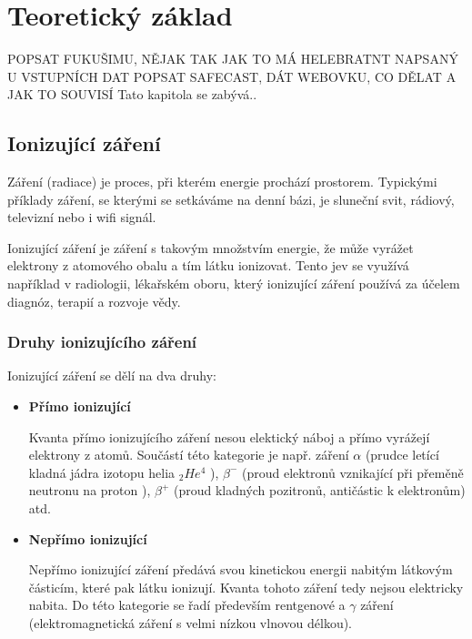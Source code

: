 \chapter{Teoretický základ}
\label{2-teorie}
POPSAT FUKUŠIMU, NĚJAK TAK JAK TO MÁ HELEBRATNT NAPSANÝ U VSTUPNÍCH DAT
POPSAT SAFECAST, DÁT WEBOVKU, CO DĚLAT A JAK TO SOUVISÍ
Tato kapitola se zabývá..
\section{Ionizující záření}
	
Záření (radiace) je proces, při kterém energie prochází prostorem. Typickými příklady záření, se kterými se setkáváme na denní bázi, je sluneční svit, rádiový, televizní nebo i wifi signál. %


Ionizující záření je záření s takovým množstvím energie, že může vyrážet elektrony z atomového obalu a tím látku ionizovat. Tento jev se využívá například v radiologii, lékařském oboru, který ionizující záření používá za účelem diagnóz, terapií a rozvoje vědy. %

\subsection{Druhy ionizujícího záření} %
Ionizující záření se dělí na dva druhy:

\begin{itemize}
	\item \textbf{Přímo ionizující}
	
		Kvanta přímo ionizujícího záření nesou elektický náboj a přímo vyrážejí elektrony z atomů. Součástí této kategorie je např. záření $\alpha$ (prudce letící kladná jádra izotopu helia $_{2}He^{4}$ %
		), $\beta^{-}$ (proud elektronů vznikající při přeměně neutronu na proton %
		), $\beta^{+}$ (proud kladných pozitronů, antičástic k elektronům) %
		 atd.
		 
	\item \textbf{Nepřímo ionizující}
	
		Nepřímo ionizující záření předává svou kinetickou energii nabitým látkovým částicím, které pak látku ionizují. Kvanta tohoto záření tedy nejsou elektricky nabita. Do této kategorie se řadí především rentgenové a $\gamma$ záření (elektromagnetická záření s velmi nízkou vlnovou délkou). %
\end{itemize}

